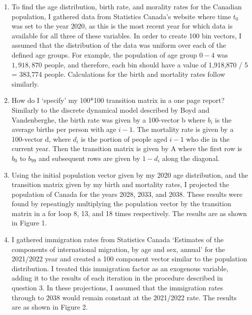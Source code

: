 \documentclass[10pt]{article}
\begin{document}
\noindent{}
\normalsize
\begin{enumerate}[leftmargin=\labelsep]
    \item 
    To find the age distribution, birth rate, and morality rates for the Canadian population, I gathered data from Statistics Canada's website where time
    $t_0$ was set to the year $2020$, as this is the most recent year for which data is available for all three of these variables. In order to
    create 100 bin vectors, I assumed that the distribution of the data was uniform over each of the defined age groups. For example, the population 
    of age group $0-4$ was $1,918,870$ people, and therefore, each bin should have a value of 1,918,870 / 5 = 383,774 people. Calculations for the birth and mortality rates
    follow similarly.
        
    \item How do I `specify' my 100*100 transition matrix in a one page report? Similarly to the discrete dynamical model described by Boyd and 
    Vandenberghe, the birth rate was given by a 100-vector b where $b_i$ is the average births per person with age $i-1$. The mortality
    rate is given by a 100-vector d, where $d_i$ is the portion of people aged $i-1$ who die in the current year. Then the transition matrix
    is given by A where the first row is $b_0$ to $b_{99}$ and subsequent rows are given by $1-d_i$ along the diagonal.
    
    \item Using the initial population vector given by my 2020 age distribution, and the transition matrix given by my birth and mortality rates, 
    I projected the population of Canada for the years 2028, 2033, and 2038. These results were found by repeatingly multiplying the population vector
    by the transition matrix in a for loop 8, 13, and 18 times respectively. The results are as shown in Figure 1.
    
    \item I gathered immigration rates from Statistics Canada `Estimates of the components of international migration, by age and sex, annual'
    for the 2021/2022 year and created a 100 component vector similar to the population distribution. I treated this immigration factor as an exogenous
    variable, adding it to the results of each iteration in the procedure described in question 3. In these projections, I assumed that 
    the immigration rates through to 2038 would remain constant at the 2021/2022 rate. The results are as shown in Figure 2.


\end{enumerate}
\end{document}
